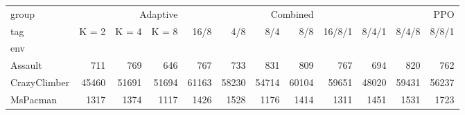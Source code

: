 \begin{tabular}{lrrrrrrrrrrr}
    \toprule
    group        & \multicolumn{3}{r}{Adaptive} & \multicolumn{4}{r}{Combined} & \multicolumn{4}{r}{PPO}                                                                  \\
    tag          & K = 2                        & K = 4                        & K = 8                   & 16/8  & 4/8   & 8/4   & 8/8   & 16/8/1 & 8/4/1 & 8/4/8 & 8/8/1 \\
    env          &                              &                              &                         &       &       &       &       &        &       &       &       \\
    \midrule
    Assault      & 711                          & 769                          & 646                     & 767   & 733   & 831   & 809   & 767    & 694   & 820   & 762   \\
    CrazyClimber & 45460                        & 51691                        & 51694                   & 61163 & 58230 & 54714 & 60104 & 59651  & 48020 & 59431 & 56237 \\
    MsPacman     & 1317                         & 1374                         & 1117                    & 1426  & 1528  & 1176  & 1414  & 1311   & 1451  & 1531  & 1723  \\
    \bottomrule
\end{tabular}
